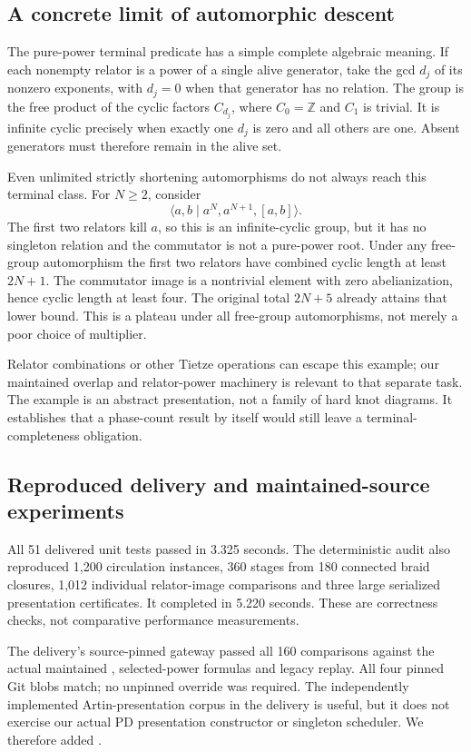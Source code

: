 \subsection{A concrete limit of automorphic descent}

The pure-power terminal predicate has a simple complete algebraic meaning.
If each nonempty relator is a power of a single alive generator, take the gcd
$d_j$ of its nonzero exponents, with $d_j=0$ when that generator has no
relation. The group is the free product of the cyclic factors $C_{d_j}$,
where $C_0=\mathbb Z$ and $C_1$ is trivial. It is infinite cyclic precisely
when exactly one $d_j$ is zero and all others are one. Absent generators
must therefore remain in the alive set.

Even unlimited strictly shortening automorphisms do not always reach this
terminal class. For $N\ge2$, consider
\[
 \langle a,b\mid a^N,a^{N+1},[a,b]\rangle.
\]
The first two relators kill $a$, so this is an infinite-cyclic group, but it
has no singleton relation and the commutator is not a pure-power root.
Under any free-group automorphism the first two relators have combined
cyclic length at least $2N+1$. The commutator image is a nontrivial element
with zero abelianization, hence cyclic length at least four. The original
total $2N+5$ already attains that lower bound. This is a plateau under all
free-group automorphisms, not merely a poor choice of multiplier.

Relator combinations or other Tietze operations can escape this example;
our maintained overlap and relator-power machinery is relevant to that
separate task. The example is an abstract presentation, not a family of hard
knot diagrams. It establishes that a phase-count result by itself would
still leave a terminal-completeness obligation.

\subsection{Reproduced delivery and maintained-source experiments}

All 51 delivered unit tests passed in 3.325 seconds. The deterministic audit
also reproduced 1,200 circulation instances, 360 stages from 180 connected
braid closures, 1,012 individual relator-image comparisons and three large
serialized presentation certificates. It completed in 5.220 seconds. These
are correctness checks, not comparative performance measurements.

The delivery's source-pinned gateway passed all 160 comparisons against the
actual maintained , selected-power formulas and legacy
replay. All four pinned Git blobs match; no unpinned override was required.
The independently implemented Artin-presentation corpus in the delivery is
useful, but it does not exercise our actual PD presentation constructor or
singleton scheduler. We therefore added
.

